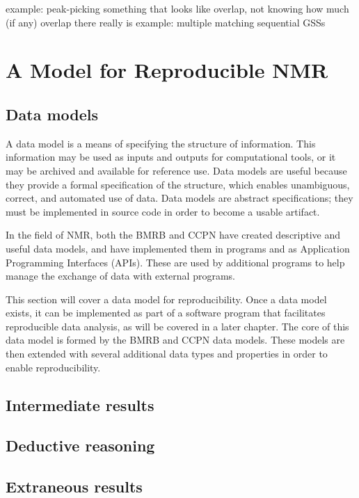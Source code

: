 example: peak-picking something that looks like overlap, not knowing how much (if any) overlap there really is
example: multiple matching sequential GSSs


\section{A Model for Reproducible NMR}

\subsection{Data models}
A data model is a means of specifying the structure of information.  This
information may be used as inputs and outputs for computational tools, or
it may be archived and available for reference use.  Data models are useful
because they provide a formal specification of the structure, which enables
unambiguous, correct, and automated use of data.  Data models are
abstract specifications; they must be implemented in source code in order
to become a usable artifact.

In the field of NMR, both the BMRB \cite{bmrb} and CCPN \cite{ccpn} have
created descriptive and useful data models, and have implemented them in
programs and as Application Programming Interfaces (APIs).  These are used
by additional programs to help manage the exchange of data with external
programs.

This section will cover a data model for reproducibility.  Once a data
model exists, it can be implemented as part of a software program that
facilitates reproducible data analysis, as will be covered in a later 
chapter.  The core of this data model is formed by the BMRB \cite{bmrb}
and CCPN \cite{ccpn} data models.  These models are then extended with
several additional data types and properties in order to enable 
reproducibility.

\subsection{Intermediate results}

\subsection{Deductive reasoning}

\subsection{Extraneous results}

